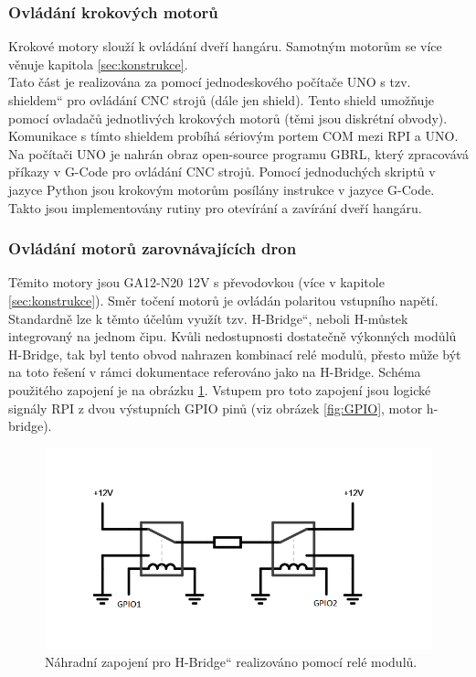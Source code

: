 \documentclass[a4paper]{article}
\newcommand\uvoz[1]{\quotedblbase #1\textquotedblleft}%
\begin{document}
    \subsubsection{Ovládání krokových motorů}
    \label{subsub:stepmot}
        Krokové motory slouží k ovládání dveří hangáru. Samotným motorům se více věnuje kapitola \ref{sec:konstrukce}.\\
    
        \noindent
        Tato část je realizována za pomocí jednodeskového počítače \acs{UNO} s tzv. \uvoz{shieldem} pro ovládání CNC strojů (dále jen shield). Tento shield umožňuje pomocí ovladačů jednotlivých krokových motorů (těmi jsou diskrétní obvody). Komunikace s tímto shieldem probíhá sériovým portem COM mezi \acs{RPI} a \acs{UNO}. Na počítači \acs{UNO} je nahrán obraz open-source programu GBRL, který zpracovává příkazy v G-Code pro ovládání CNC strojů. Pomocí jednoduchých skriptů v jazyce Python jsou krokovým motorům posílány instrukce v jazyce G-Code. Takto jsou implementovány rutiny pro otevírání a zavírání dveří hangáru.
    
    \subsubsection{Ovládání motorů zarovnávajících dron}
    \label{subsub:dronmot}
        Těmito motory jsou GA12-N20 12V s převodovkou (více v kapitole \ref{sec:konstrukce}). Směr točení motorů je ovládán polaritou vstupního napětí. Standardně lze k těmto účelům využít tzv. \uvoz{H-Bridge}, neboli H-můstek integrovaný na jednom čipu. Kvůli nedostupnosti dostatečně výkonných modůlů H-Bridge, tak byl tento obvod nahrazen kombinací relé modulů, přesto může být na toto řešení v rámci dokumentace referováno jako na H-Bridge. Schéma použitého zapojení je na obrázku \ref{fig:hbridge}. Vstupem pro toto zapojení jsou logické signály \acs{RPI} z dvou výstupních GPIO pinů (viz obrázek \ref{fig:GPIO}, motor h-bridge).\\

        \begin{figure}[h!]
            \centering
            \includegraphics[width=0.75\linewidth]{schematics/circuit-20241208-1446.png}
            \caption{Náhradní zapojení pro \uvoz{H-Bridge} realizováno pomocí relé modulů.}
            \label{fig:hbridge}
        \end{figure}
\end{document}
